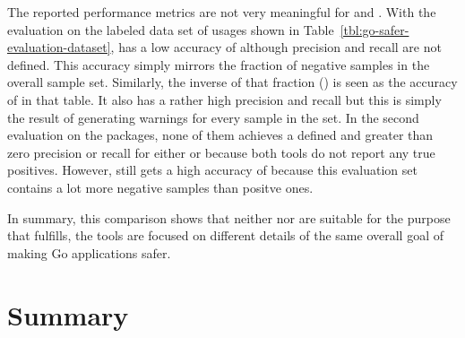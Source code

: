 The reported performance metrics are not very meaningful for \toolVet{} and \toolGosec{}.
With the evaluation on the labeled data set of \unsafe{} usages shown in Table~\ref{tbl:go-safer-evaluation-dataset},
\toolVet{} has a low accuracy of  although precision and recall are not defined.
This accuracy simply mirrors the fraction of negative samples in the overall sample set.
Similarly, the inverse of that fraction () is seen as the accuracy of \toolGosec{} in that table.
It also has a rather high precision and recall but this is simply the result of generating warnings for every sample in
the set.
In the second evaluation on the  packages, none of them achieves a defined and greater than zero precision
or recall for either \toolVet{} or \toolGosec{} because both tools do not report any true positives.
However, \toolVet{} still gets a high accuracy of  because this evaluation set contains a lot more
negative samples than positve ones.

In summary, this comparison shows that neither \toolVet{} nor \toolGosec{} are suitable for the purpose that
\toolSafer{} fulfills, the tools are focused on different details of the same overall goal of making Go applications
safer.



\section{Summary}\label{sec:go-safer:summary}

